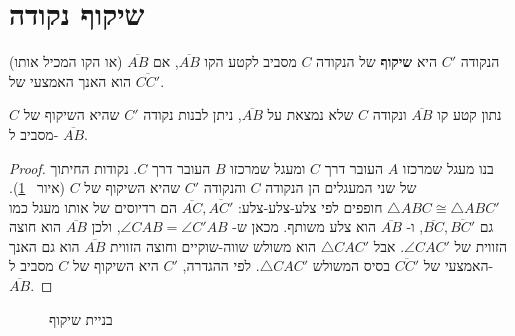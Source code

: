 
\section{שיקוף נקודה}\label{s.reflection}

\begin{definition}
הנקודה
$C'$
היא
\textbf{%
שיקוף%
}
של הנקודה
$C$
מסביב לקטע הקו
$\overline{AB}$,
אם 
$\overline{AB}$
(או הקו המכיל אותו) הוא האנך האמצעי של
$\overline{CC'}$.
\end{definition}
\begin{theorem}\label{thm.reflection}
נתון קטע קו
$\overline{AB}$
ונקודה 
$C$
שלא נמצאת על
$\overline{AB}$,
ניתן לבנות נקודה 
$C'$
שהיא השיקוף של
$C$
מסביב ל-%
$\overline{AB}$.
\end{theorem}

\begin{proof}
בנו מעגל שמרכזו
$A$
העובר דרך
$C$
ומעגל שמרכזו
$B$
העובר דרך
$C$.
נקודות החיתוך של שני המעגלים הן הנקודה
$C$
והנקודה
$C'$
שהיא השיקוף של
$C$
(איור%
~\ref{f.compass-reflection}).
$\triangle ABC\cong\triangle ABC'$
חופפים לפי צלע-צלע-צלע:
$\overline{AC},\overline{AC'}$
הם רדיוסים של אותו מעגל כמו גם
$\overline{BC},\overline{BC'}$,
ו-%
$\overline{AB}$
הוא צלע משותף. מכאן ש-%
$\angle CAB = \angle C'AB$,
ולכן
$\overline{AB}$
הוא חוצה הזווית של
$\angle CAC'$.
אבל
$\triangle CAC'$
הוא משולש שווה-שוקיים וחוצה הזווית
$\overline{AB}$
הוא גם האנך האמצעי של
$\overline{CC'}$
בסיס המשולש
$\triangle CAC'$.
לפי ההגדרה, 
$C'$
היא השיקוף של
$C$
מסביב ל-%
$\overline{AB}$.
\end{proof}

\begin{figure}[tb]
\begin{center}
\caption{בניית שיקוף}\label{f.compass-reflection}
\end{center}
\end{figure}

